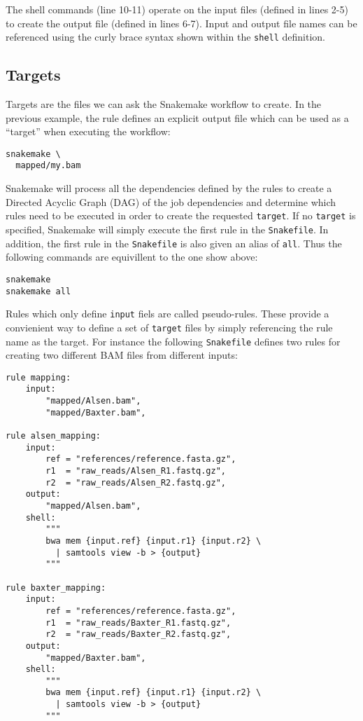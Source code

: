 The shell commands (line 10-11) operate on the input files (defined in lines 2-5) to create the output file (defined in lines 6-7). Input and output
file names can be referenced using the curly brace syntax shown within the \texttt{shell} definition.

\subsection{Targets}

Targets are the files we can ask the Snakemake workflow to create. In the previous example, the rule defines an explicit
output file which can be used as a ``target'' when executing the workflow:

\begin{lstlisting}
snakemake \
  mapped/my.bam
\end{lstlisting}

Snakemake will process all the dependencies defined by the rules to create a Directed Acyclic Graph (DAG) of the job dependencies and determine which
rules need to be executed in order to create the requested \texttt{target}. If no \texttt{target} is specified, Snakemake will simply execute the first
rule in the \texttt{Snakefile}. In addition, the first rule in the \texttt{Snakefile} is also given an alias of \texttt{all}. Thus the following commands
are equivillent to the one show above:

\begin{lstlisting}
snakemake
snakemake all
\end{lstlisting}

Rules which only define \texttt{input} fiels are called pseudo-rules. These provide a convienient way to define a set of \texttt{target} files by simply
referencing the rule name as the target. For instance the following \texttt{Snakefile} defines two rules for creating two different BAM files from
different inputs:

\begin{lstlisting}
rule mapping:
	input:
		"mapped/Alsen.bam",
		"mapped/Baxter.bam",

rule alsen_mapping:
	input:
		ref = "references/reference.fasta.gz",
		r1  = "raw_reads/Alsen_R1.fastq.gz",
		r2  = "raw_reads/Alsen_R2.fastq.gz",
	output:
		"mapped/Alsen.bam",
	shell:
		"""
		bwa mem {input.ref} {input.r1} {input.r2} \
		  | samtools view -b > {output}
		"""

rule baxter_mapping:
	input:
		ref = "references/reference.fasta.gz",
		r1  = "raw_reads/Baxter_R1.fastq.gz",
		r2  = "raw_reads/Baxter_R2.fastq.gz",
	output:
		"mapped/Baxter.bam",
	shell:
		"""
		bwa mem {input.ref} {input.r1} {input.r2} \
		  | samtools view -b > {output}
		"""
\end{lstlisting}

